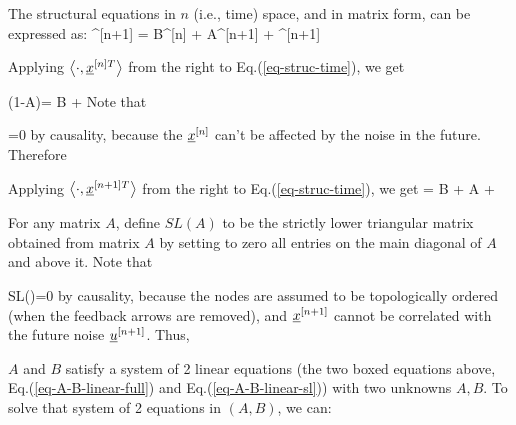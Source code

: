 The structural equations in $n$ (i.e., time) space,
and in matrix form, can be expressed as:
\beq
\rvx^{[n+1]} = B\rvx^{[n]} + A\rvx^{[n+1]}
+ \rvu^{[n+1]}
\label{eq-struc-time}
\eeq

Applying $\left\langle\cdot, {\underline{x}}^{[n]T} \right\rangle$
from the right to Eq.(\ref{eq-struc-time}), we get

\beq 
(1-A)=
B 
+ 
\eeq
Note that

\beq
{}=0
\eeq
by causality, 
because the ${\underline{x}}^{[n]}$
can't be affected by the noise in the future.
Therefore

\beq
{}
\label{eq-A-B-linear-full}
\eeq


Applying $\left\langle\cdot, {\underline{x}}^{[n+1]T} \right\rangle$
from the right to Eq.(\ref{eq-struc-time}), we get
\beq
{}
= B
 + A
+ 
\eeq

For any matrix $A$,
define $SL(A)$ 
to be the strictly lower triangular
matrix obtained from matrix $A$ by
setting to zero all entries 
on the main diagonal of $A$ and above it.
Note that

\beq 
SL()=0
\eeq
by causality,
because the nodes are assumed to be topologically ordered (when the feedback
arrows are removed),
and ${\underline{x}}^{[n+1]}$ cannot be correlated
with the future noise ${\underline{u}}^{[n+1]}$.
Thus,

\beq
{}
\label{eq-A-B-linear-sl}
\eeq

$A$ and $B$ satisfy a system of 2 linear equations (the two boxed
equations above, Eq.(\ref{eq-A-B-linear-full})
and Eq.(\ref{eq-A-B-linear-sl})) with two unknowns $A,B$.
To solve that system of 2 equations in $(A, B)$, we can:

